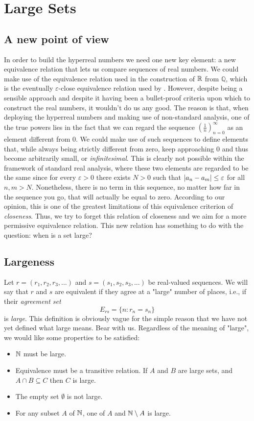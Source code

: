 \section{Large Sets} \label{sec:filters}
\subsection{A new point of view}
In order to build the hyperreal numbers we need one new key element: a new equivalence relation that lets us compare sequences of real numbers. We could make use of the equivalence relation used in the construction of $\mathbb{R}$ from $\mathbb{Q}$, which is the eventually $\varepsilon$-close equivalence relation used by \cite{tao2022analysis}. However, despite being a sensible approach and despite it having been a bullet-proof criteria upon which to construct the real numbers, it wouldn't do us any good. The reason is that, when deploying the hyperreal numbers and making use of non-standard analysis, one of the true powers lies in the fact that we can regard the sequence $(\frac{1}{n})_{n=0}^\infty$ as an element different from $0$. We could make use of such sequences to define elements that, while always being strictly different from zero, keep approaching $0$ and thus become arbitrarily small, or \textit{infinitesimal}. This is clearly not possible within the framework of standard real analysis, where these two elements are regarded to be the same since for every $\varepsilon>0$ there exists $N>0$ such that $\left\lvert a_n - a_m \right\rvert \leq \varepsilon$ for all $n, m > N$. Nonetheless, there is no term in this sequence, no matter how far in the sequence you go, that will actually be equal to zero.
According to our opinion, this is one of the greatest limitations of this equivalence criterion of \textit{closeness}. Thus, we try to forget this relation of closeness and we aim for a more permissive equivalence relation.
This new relation has something to do with the question: when is a set large?

\subsection{Largeness}
Let $r=(r_1,r_2,r_3,...)$ and $s=(s_1,s_2,s_3,...)$ be real-valued sequences. We will say that $r$ and $s$ are equivalent if they agree at a "large" number of places, i.e., if their \textit{agreement set}
\begin{equation*}
    E_{rs} = \{n:r_n=s_n\}
\end{equation*}
is \textit{large}. This definition is obviously vague for the simple reason that we have not yet defined what large means. Bear with us. Regardless of the meaning of "large", we would like some properties to be satisfied:
\begin{itemize}
    \item $\mathbb{N}$ must be large.
    \item Equivalence must be a transitive relation. If $A$ and $B$ are large sets, and $A \cap B \subseteq C$ then $C$ is large.
    \item The empty set $\emptyset$ is not large. 
    \item For any subset $A$ of $\mathbb{N}$, one of $A$ and $\mathbb{N} \setminus A$ is large.
\end{itemize}

